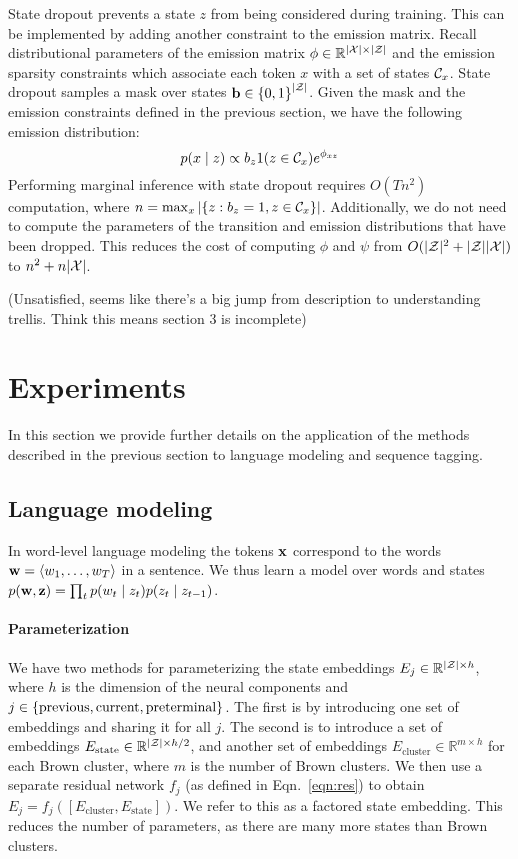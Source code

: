 \documentclass[11pt,a4paper]{article}
\begin{document}
State dropout prevents a state $z$ from being considered during training.
This can be implemented by adding another constraint to the emission matrix.
Recall distributional parameters of the emission matrix
$\phi \in \mathbb{R}^{|\mathcal{X}|\times|\mathcal{Z}|}$
and the emission sparsity constraints which associate each token $x$
with a set of states $\mathcal{C}_x$.
State dropout samples a mask over states $\mathbf{b} \in \left\{0,1\right\}^{|\mathcal{Z}|}$.
Given the mask and the emission constraints
defined in the previous section,
we have the following emission distribution:
\begin{equation}
\label{eqn:state_dropout}
p(x \mid z) \propto b_{z}1(z \in \mathcal{C}_x)e^{\phi_{xz}}
\end{equation}
Performing marginal inference with state dropout requires $O(Tn^2)$ computation,
where $n = \max_x \left|\left\{z:b_z=1,z \in \mathcal{C}_x\right\}\right|$.
Additionally, we do not need to compute the parameters of the
transition and emission distributions that have been dropped. 
This reduces the cost of computing $\phi$ and $\psi$ from
$O(|\mathcal{Z}|^2+|\mathcal{Z}||\mathcal{X}|)$ to $n^2 + n|\mathcal{X}|$.

(Unsatisfied,
seems like there's a big jump from description to understanding trellis.
Think this means section 3 is incomplete)

\section{Experiments}
\label{sec:experiments}
In this section we provide further details on the application
of the methods described in the previous section
to language modeling and sequence tagging.

\subsection{Language modeling}
In word-level language modeling the tokens $\mathbf{x}$ correspond to the words
$\mathbf{w} = \langle w_1,\ldots,w_T \rangle$ in a sentence.
We thus learn a model over words and states
$p(\mathbf{w},\mathbf{z}) = \prod_t p(w_t\mid z_t)p(z_t \mid z_{t-1})$.

\paragraph{Parameterization}
We have two methods for parameterizing the state embeddings
$E_j \in \mathbb{R}^{|\mathcal{Z}|\times h}$, where $h$ is the dimension of the neural components
and $j \in \left\{\textrm{previous},\textrm{current},\textrm{preterminal}\right\}$.
The first is by introducing one set of embeddings and sharing it for all $j$.
The second is to introduce a set of embeddings $E_{\textrm{state}}\in\mathbb{R}^{|\mathcal{Z}|\times h/2}$,
and another set of embeddings
$E_{\textrm{cluster}}\in\mathbb{R}^{m \times h}$ for each Brown cluster,
where $m$ is the number of Brown clusters.
We then use a separate residual network $f_j$ (as defined in Eqn.~\ref{eqn:res})
to obtain $E_j = f_j([E_\textrm{cluster}, E_\textrm{state}])$.
We refer to this as a factored state embedding.
This reduces the number of parameters, as there are many more states than Brown clusters.
\end{document}
